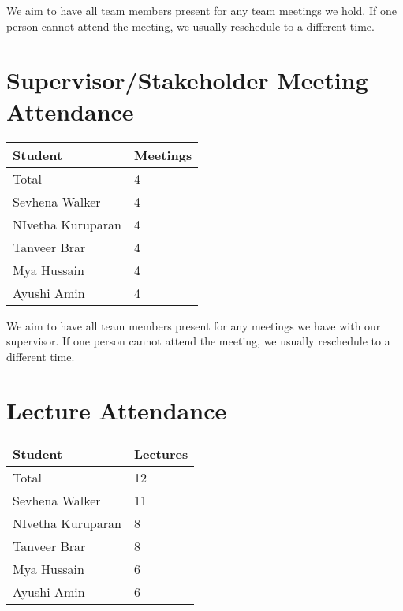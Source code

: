 \documentclass{article}
\begin{document}
We aim to have all team members present for any team meetings we hold. If one person cannot attend the meeting, we usually reschedule to a different time.

\section{Supervisor/Stakeholder Meeting Attendance}

\begin{table}[H]
\centering
\begin{tabular}{ll}
\toprule
\textbf{Student} & \textbf{Meetings}\\
\midrule
Total & 4\\
Sevhena Walker & 4\\
NIvetha Kuruparan & 4\\
Tanveer Brar & 4\\
Mya Hussain & 4\\
Ayushi Amin & 4\\
\bottomrule
\end{tabular}
\end{table}

We aim to have all team members present for any meetings we have with our supervisor. If one person cannot attend the meeting, we usually reschedule to a different time.

\section{Lecture Attendance}


\begin{table}[H]
\centering
\begin{tabular}{ll}
\toprule
\textbf{Student} & \textbf{Lectures}\\
\midrule
Total & 12\\
Sevhena Walker & 11\\
NIvetha Kuruparan & 8\\
Tanveer Brar & 8\\
Mya Hussain & 6\\
Ayushi Amin & 6\\
\bottomrule
\end{tabular}
\end{table}
\end{document}
